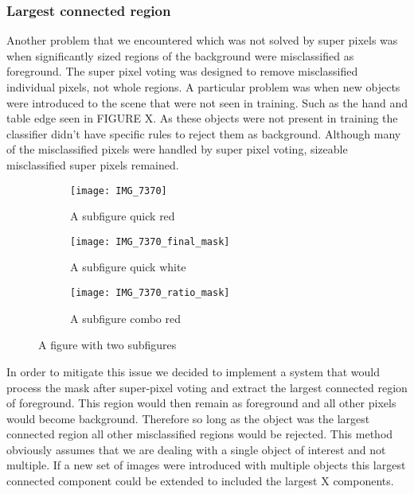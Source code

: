 \documentclass[12pt]{IIBproject}
\begin{document}
\subsubsection{Largest connected region}
Another problem that we encountered which was not solved by super pixels was when significantly sized regions of the background were misclassified as foreground. The super pixel voting was designed to remove misclassified individual pixels, not whole regions. A particular problem was when new objects were introduced to the scene that were not seen in training. Such as the hand and table edge seen in FIGURE X. As these objects were not present in training the classifier didn't have specific rules to reject them as background. Although many of the misclassified pixels were handled by super pixel voting, sizeable misclassified super pixels remained.
\begin{figure}[H]
\centering
\begin{subfigure}{.5\textwidth}
  \centering
  \texttt{[image: IMG\_7370]}
  \caption{A subfigure quick red}
  \label{fig:sub2}
\end{subfigure}
\begin{subfigure}{.5\textwidth}
  \centering
  \texttt{[image: IMG\_7370\_final\_mask]}
  \caption{A subfigure quick white}
  \label{fig:sub1}
\end{subfigure}%
\begin{subfigure}{.5\textwidth}
  \centering
  \texttt{[image: IMG\_7370\_ratio\_mask]}
  \caption{A subfigure combo red}
  \label{fig:sub2}
\end{subfigure}

\caption{A figure with two subfigures}
\label{fig:test}
\end{figure}
In order to mitigate this issue we decided to implement a system that would process the mask after super-pixel voting and extract the largest connected region of foreground. This region would then remain as foreground and all other pixels would become background. Therefore so long as the object was the largest connected region all other misclassified regions would be rejected. This method obviously assumes that we are dealing with a single object of interest and not multiple. If a new set of images were introduced with multiple objects this largest connected component could be extended to included the largest X components. 
\end{document}
